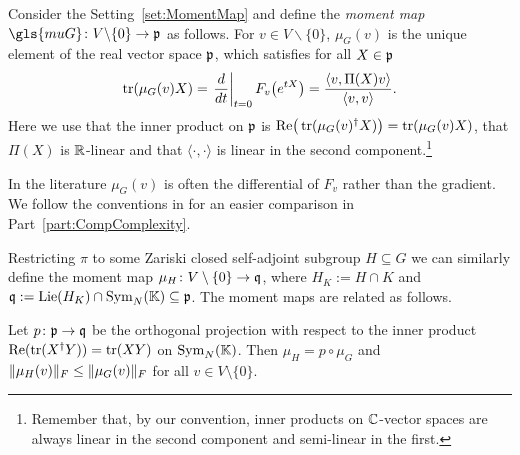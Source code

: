 \begin{defn} \label{defn:MomentMap}
	Consider the Setting~\ref{set:MomentMap} and define the \emph{moment map} $\gls{muG} \colon V \backslash \{0\} \to \pfrak$ as follows.
	For $v \in V \backslash \{ 0 \}$, $\mu_G(v)$ is the unique element of the real vector space $\mathfrak{p}$, which satisfies for all $X \in \mathfrak{p}$
	\begin{align*}
		\operatorname{tr} ( \mu_G(v) X ) = \left.  \frac{d}{dt} \right\vert_{t=0} F_v \big( e^{tX} \big) = \frac{\langle v, \Pi(X)v \rangle}{\langle v,v \rangle}.
	\end{align*}
	Here we use that the inner product on $\mathfrak{p}$ is $\mathrm{Re} \big( \operatorname{tr} ( \mu_G(v)^{\dagger} X ) \big) = \operatorname{tr} ( \mu_G(v) X )$, that $\Pi(X)$ is $\mathbb R$-linear and that $\langle \cdot, \cdot \rangle$ is linear in the second component.\footnote{Remember that, by our convention, inner products on $\mathbb C$-vector spaces are always linear in the second component and semi-linear in the first.}
	\hfill{}
\end{defn}

\begin{remark}
	In the literature $\mu_G(v)$ is often the differential of $F_v$ rather than the gradient. We follow the conventions in \cite{GradflowArXiv} for an easier comparison in Part~\ref{part:CompComplexity}.
\hfill\remSymbol
\end{remark}


Restricting $\pi$ to some Zariski closed self-adjoint subgroup $H \subseteq G$ we can similarly define the moment map $\mu_{H} \colon V \setminus \{0\} \to \mathfrak{q}$, where $H_K := H \cap K$ and $\mathfrak{q} := \operatorname{Lie}(H_K) \cap \operatorname{Sym}_N(\mathbb K) \subseteq \mathfrak{p}$.
The moment maps are related as follows.

\begin{prop}  \label{prop:MomentMaps}
	Let $p \colon \mathfrak{p} \to \mathfrak{q}$ be the orthogonal projection with respect to the inner product $\mathrm{Re}(\operatorname{tr}(X^{\dagger} Y)) = \operatorname{tr}(XY)$ on $\operatorname{Sym}_N(\mathbb K)$. Then $\mu_{H} = p \circ \mu_G$ and $\lVert\mu_{H}(v)\rVert_F \leq \lVert\mu_{G}(v)\rVert_F$ for all $v \in V \setminus \lbrace 0 \rbrace$.
\end{prop}

